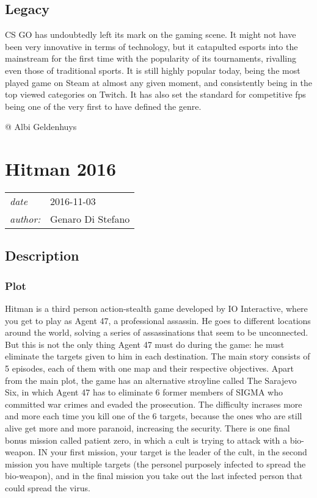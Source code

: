 \documentclass[a4paper,10pt]{book}
\newcommand{\pageHeader}[4]{
    \section{#1}
    \vspace{-0.3cm}
    \begin{table}[h!]
     \begin{tabular}{ll}
        \hline
        \textit{date} & #2 \\
        \textit{author: } & #3\\
        \hline
     \end{tabular}
    \end{table}
    \vspace{-0.3cm}
}
\begin{document}
 \subsection{Legacy }
 
          CS GO has undoubtedly left its mark on the gaming scene. It might not have been very innovative in
          terms of technology, but it catapulted esports into the mainstream for the first time with the
          popularity of its tournaments, rivalling even those of traditional sports. It is still highly popular today,
          being the most played game on Steam at almost any given moment, and consistently being in the
          top viewed categories on Twitch. It has also set the standard for competitive fps being one of the
          very first to have defined the genre.
         
 
 @ Albi Geldenhuys 
 
 \newpage\pageHeader{Hitman 2016}{2016-11-03}{Genaro Di Stefano}{A realistic action-stealth video game}
 \subsection{Description }
 \subsubsection{Plot }
 
          Hitman is a third person action-stealth game developed by IO Interactive, where you get to play as Agent 47, a professional assassin. He goes to different locations around the world, solving a series of assassinations that seem to be unconnected. But this is not the only thing Agent 47 must do during the game: he must eliminate the targets given to him in each destination. The main story consists of 5 episodes, each of them with one map and their respective objectives.   Apart from the main plot, the game has an alternative stroyline called The Sarajevo Six, in which Agent 47 has to eliminate 6 former members of SIGMA who committed war crimes and evaded the prosecution. The difficulty incrases more and more each time you kill one of the 6 targets, because the ones who are still alive get more and more paranoid, increasing the security. There is one final bonus mission called patient zero, in which a cult is trying to attack with a bio-weapon. IN your first mission, your target is the leader of the cult, in the second mission you have multiple targets (the personel purposely infected to spread the bio-weapon), and in the final mission you take out the last infected person that could spread the virus.
           
\end{document}
